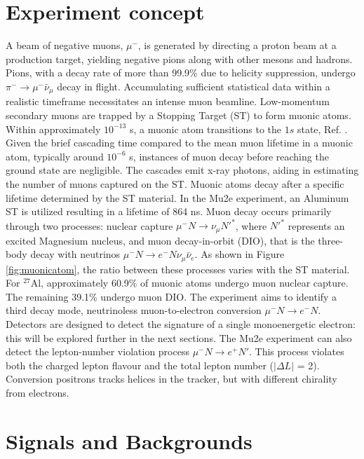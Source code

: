 \section{Experiment concept}
A beam of negative muons, $\mu ^-$, is generated by directing a proton beam at a 
production target, yielding negative pions along with other mesons and hadrons. 
Pions, with a decay rate of more than 99.9\% due to helicity suppression, undergo 
$\pi ^- \rightarrow \mu ^- \bar{\nu}_\mu$ decay in flight. 
Accumulating sufficient statistical data within a realistic timeframe necessitates 
an intense muon beamline. 
Low-momentum secondary muons are trapped by a Stopping Target (ST) to form muonic atoms. 
Within approximately $10^{-13}$ s, 
a muonic atom transitions to the $1s$ state, Ref. \cite{MEASDAY2001243}. 
Given the brief cascading time compared to the mean muon lifetime in a muonic atom, 
typically around $10^{-6}$ s, 
instances of muon decay before reaching the ground state are negligible. 
The cascades emit x-ray photons, aiding in estimating the number of muons captured 
on the ST. 
Muonic atoms decay after a specific lifetime determined by the ST material. 
In the Mu2e experiment, an Aluminum ST is utilized resulting in a lifetime of 
864 ns. Muon decay occurs primarily through two processes: 
nuclear capture $\mu^- N \rightarrow \nu_\mu N'^* $, where $N'^*$ represents an excited 
Magnesium nucleus, and muon decay-in-orbit (DIO), 
that is the three-body decay with neutrinos $\mu ^- N \rightarrow e^- N \nu_\mu \bar{\nu}_e$. 
As shown in Figure \ref{fig:muonicatom}, the ratio between these 
processes varies with the ST material. For $^{27}$Al, approximately 60.9\% 
of muonic atoms undergo muon nuclear capture. The remaining 39.1\% undergo muon DIO. 
The experiment aims to identify a third decay mode, neutrinoless muon-to-electron 
conversion $\mu^- N \rightarrow e^- N $. Detectors are designed to detect the signature of a 
single monoenergetic electron: this will be explored further in the next sections.
The Mu2e experiment can also detect the lepton-number violation process 
$\mu^- N \rightarrow e^+ N'$.
This process violates both the charged lepton flavour and the total lepton 
number ($|\Delta L|$ = 2). 
Conversion positrons tracks helices in the tracker, but with different chirality from electrons. 
\section{Signals and Backgrounds}\label{sigandbkg}
